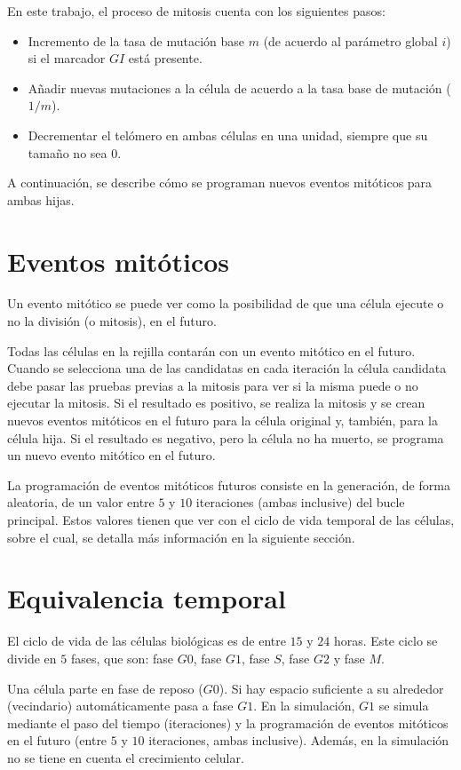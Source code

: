 En este trabajo, el proceso de mitosis cuenta con los siguientes pasos:

\begin{itemize}
    \item Incremento de la tasa de mutación base $m$ (de acuerdo al parámetro global $i$) si el marcador
    $GI$ está presente.
    \item Añadir nuevas mutaciones a la célula de acuerdo a la tasa base de mutación ($1/m$).
    \item Decrementar el telómero en ambas células en una unidad, siempre que su tamaño no sea 0.
\end{itemize}

A continuación, se describe cómo se programan nuevos eventos mitóticos para ambas hijas.

\section{Eventos mitóticos}

Un evento mitótico se puede ver como la posibilidad de que una célula ejecute o no la división (o mitosis),
en el futuro.

Todas las células en la rejilla contarán con un evento mitótico en el futuro. Cuando se selecciona una
de las candidatas en cada iteración la célula candidata debe pasar las pruebas previas a la mitosis para ver
si la misma puede o no ejecutar la mitosis. Si el resultado es positivo, se realiza la mitosis y se crean
nuevos eventos mitóticos en el futuro para la célula original y, también, para la célula hija.
Si el resultado es negativo, pero la célula no ha muerto, se programa un nuevo evento mitótico en el futuro.

La programación de eventos mitóticos futuros consiste en la generación, de forma aleatoria, de un valor
entre $5$ y $10$ iteraciones (ambas inclusive) del bucle principal. Estos valores tienen que ver con el ciclo de vida
temporal de las células, sobre el cual, se detalla más información en la siguiente sección.

\section{Equivalencia temporal}

El ciclo de vida de las células biológicas es de entre $15$ y $24$ horas. Este ciclo se divide en $5$ fases, que son:
fase $G0$, fase $G1$, fase $S$, fase $G2$ y fase $M$.

Una célula parte en fase de reposo ($G0$). Si hay espacio suficiente a su alrededor (vecindario) automáticamente pasa
a fase $G1$. En la simulación, $G1$ se simula mediante el paso del tiempo (iteraciones) y la programación de
eventos mitóticos en el futuro (entre $5$ y $10$ iteraciones, ambas inclusive). Además, en la simulación no se
tiene en cuenta el crecimiento celular.

